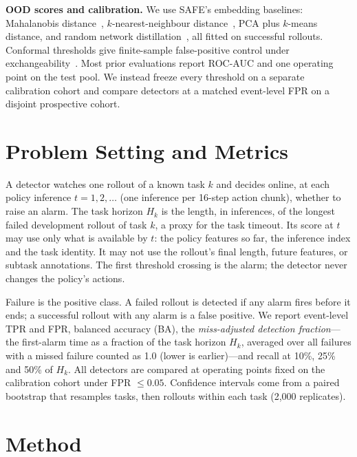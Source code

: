 \documentclass[conference,a4paper]{IEEEtran}
\begin{document}
\textbf{OOD scores and calibration.} We use SAFE's embedding baselines: Mahalanobis
distance~\cite{lee2018mahalanobis}, $k$-nearest-neighbour distance~\cite{sun2022knn}, PCA
plus $k$-means distance, and random network distillation~\cite{burda2019rnd}, all fitted on
successful rollouts. Conformal thresholds give finite-sample false-positive control under
exchangeability~\cite{angelopoulos2021gentle}. Most prior evaluations report ROC-AUC and one
operating point on the test pool. We instead freeze every threshold on a separate calibration
cohort and compare detectors at a matched event-level FPR on a disjoint prospective cohort.

\section{Problem Setting and Metrics}

A detector watches one rollout of a known task $k$ and decides online, at each policy
inference $t = 1, 2, \dots$ (one inference per 16-step action chunk), whether to raise an
alarm. The task horizon $H_k$ is the length, in inferences, of the longest failed
development rollout of task $k$, a proxy for the task timeout. Its score at $t$ may use only what is
available by $t$: the policy features so far, the inference index and the task identity.
It may not use the rollout's final length, future features, or subtask annotations. The
first threshold crossing is the alarm; the detector never changes the policy's actions.

Failure is the positive class. A failed rollout is detected if any alarm fires before it
ends; a successful rollout with any alarm is a false positive. We report event-level TPR
and FPR, balanced accuracy (BA), the \emph{miss-adjusted detection fraction}---the
first-alarm time as a fraction of the task horizon $H_k$, averaged over all failures with a
missed failure counted as 1.0 (lower is earlier)---and recall at 10\%, 25\% and 50\% of
$H_k$. All detectors are compared at operating points fixed on the calibration cohort under
FPR $\le 0.05$. Confidence intervals come from a paired bootstrap that resamples tasks, then
rollouts within each task (2,000 replicates).

\section{Method}
\end{document}

